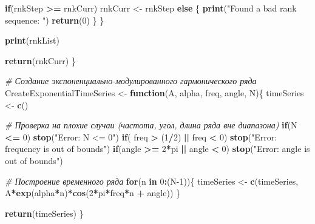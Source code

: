 \documentclass[
]{article}
\newenvironment{Shaded}{\begin{snugshade}}{\end{snugshade}}
\newcommand{\CommentTok}[1]{\textcolor[rgb]{0.56,0.35,0.01}{\textit{#1}}}
\newcommand{\ControlFlowTok}[1]{\textcolor[rgb]{0.13,0.29,0.53}{\textbf{#1}}}
\newcommand{\DecValTok}[1]{\textcolor[rgb]{0.00,0.00,0.81}{#1}}
\newcommand{\FunctionTok}[1]{\textcolor[rgb]{0.13,0.29,0.53}{\textbf{#1}}}
\newcommand{\NormalTok}[1]{#1}
\newcommand{\OtherTok}[1]{\textcolor[rgb]{0.56,0.35,0.01}{#1}}
\newcommand{\SpecialCharTok}[1]{\textcolor[rgb]{0.81,0.36,0.00}{\textbf{#1}}}
\newcommand{\StringTok}[1]{\textcolor[rgb]{0.31,0.60,0.02}{#1}}
\begin{document}
\begin{Shaded}
\begin{Highlighting}[]
    \ControlFlowTok{if}\NormalTok{(rnkStep }\SpecialCharTok{\textgreater{}=}\NormalTok{ rnkCurr) rnkCurr }\OtherTok{\textless{}{-}}\NormalTok{ rnkStep}
    \ControlFlowTok{else}\NormalTok{ \{}
      \FunctionTok{print}\NormalTok{(}\StringTok{"Found a bad rank sequence: "}\NormalTok{)}
      \FunctionTok{return}\NormalTok{(}\DecValTok{0}\NormalTok{)}
\NormalTok{    \}}
\NormalTok{  \}}
  
  \FunctionTok{print}\NormalTok{(rnkList)}
  
  \FunctionTok{return}\NormalTok{(rnkCurr)}
\NormalTok{\}}


\CommentTok{\# Создание экспоненциально{-}модулированного гармонического ряда}
\NormalTok{CreateExponentialTimeSeries }\OtherTok{\textless{}{-}} \ControlFlowTok{function}\NormalTok{(A, alpha, freq, angle, N)\{}
\NormalTok{  timeSeries }\OtherTok{\textless{}{-}} \FunctionTok{c}\NormalTok{()}
  
  \CommentTok{\# Проверка на плохие случаи (частота, угол, длина ряда вне диапазона)}
  \ControlFlowTok{if}\NormalTok{(N }\SpecialCharTok{\textless{}=} \DecValTok{0}\NormalTok{) }\FunctionTok{stop}\NormalTok{(}\StringTok{"Error: N \textless{}= 0"}\NormalTok{)}
  \ControlFlowTok{if}\NormalTok{( freq }\SpecialCharTok{\textgreater{}}\NormalTok{ (}\DecValTok{1}\SpecialCharTok{/}\DecValTok{2}\NormalTok{) }\SpecialCharTok{||}\NormalTok{ freq }\SpecialCharTok{\textless{}} \DecValTok{0}\NormalTok{) }\FunctionTok{stop}\NormalTok{(}\StringTok{"Error: frequency is out of bounds"}\NormalTok{)}
  \ControlFlowTok{if}\NormalTok{(angle }\SpecialCharTok{\textgreater{}=} \DecValTok{2}\SpecialCharTok{*}\NormalTok{pi }\SpecialCharTok{||}\NormalTok{ angle }\SpecialCharTok{\textless{}} \DecValTok{0}\NormalTok{) }\FunctionTok{stop}\NormalTok{(}\StringTok{"Error: angle is out of bounds"}\NormalTok{)}
  
  \CommentTok{\# Построение временного ряда}
  \ControlFlowTok{for}\NormalTok{(n }\ControlFlowTok{in} \DecValTok{0}\SpecialCharTok{:}\NormalTok{(N}\DecValTok{{-}1}\NormalTok{))\{}
\NormalTok{    timeSeries }\OtherTok{\textless{}{-}} \FunctionTok{c}\NormalTok{(timeSeries, A}\SpecialCharTok{*}\FunctionTok{exp}\NormalTok{(alpha}\SpecialCharTok{*}\NormalTok{n)}\SpecialCharTok{*}\FunctionTok{cos}\NormalTok{(}\DecValTok{2}\SpecialCharTok{*}\NormalTok{pi}\SpecialCharTok{*}\NormalTok{freq}\SpecialCharTok{*}\NormalTok{n }\SpecialCharTok{+}\NormalTok{ angle))}
\NormalTok{  \}}
  
  \FunctionTok{return}\NormalTok{(timeSeries)}
\NormalTok{\}}



\end{Highlighting}
\end{Shaded}
\end{document}
